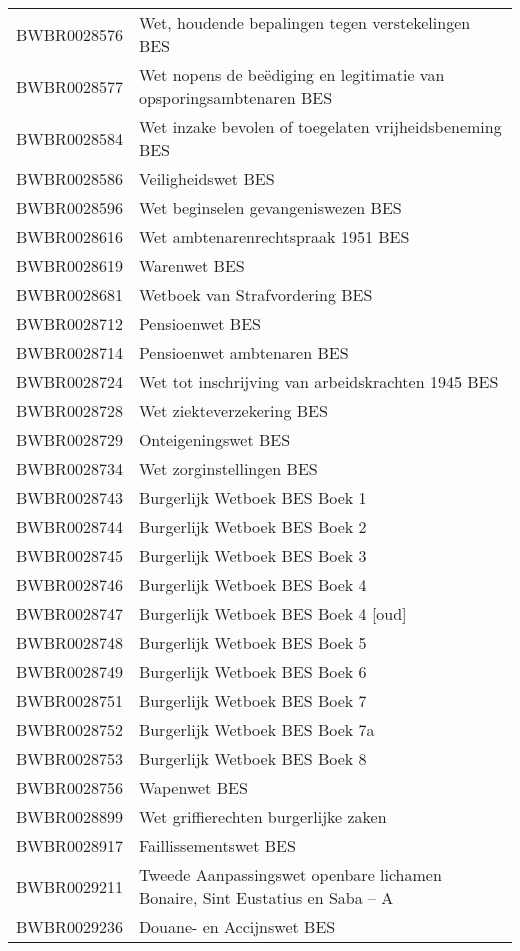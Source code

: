 \begin{longtable}{lp{}}
BWBR0028576 & Wet, houdende bepalingen tegen verstekelingen BES \\
BWBR0028577 & Wet nopens de beëdiging en legitimatie van opsporingsambtenaren BES \\
BWBR0028584 & Wet inzake bevolen of toegelaten vrijheidsbeneming BES \\
BWBR0028586 & Veiligheidswet BES \\
BWBR0028596 & Wet beginselen gevangeniswezen BES  \\
BWBR0028616 & Wet ambtenarenrechtspraak 1951 BES \\
BWBR0028619 & Warenwet BES  \\
BWBR0028681 & Wetboek van Strafvordering BES  \\
BWBR0028712 & Pensioenwet BES  \\
BWBR0028714 & Pensioenwet ambtenaren BES \\
BWBR0028724 & Wet tot inschrijving van arbeidskrachten 1945 BES \\
BWBR0028728 & Wet ziekteverzekering BES  \\
BWBR0028729 & Onteigeningswet BES  \\
BWBR0028734 & Wet zorginstellingen BES  \\
BWBR0028743 & Burgerlijk Wetboek BES Boek 1 \\
BWBR0028744 & Burgerlijk Wetboek BES Boek 2 \\
BWBR0028745 & Burgerlijk Wetboek BES Boek 3  \\
BWBR0028746 & Burgerlijk Wetboek BES Boek 4 \\
BWBR0028747 & Burgerlijk Wetboek BES Boek 4 [oud] \\
BWBR0028748 & Burgerlijk Wetboek BES Boek 5 \\
BWBR0028749 & Burgerlijk Wetboek BES Boek 6 \\
BWBR0028751 & Burgerlijk Wetboek BES Boek 7 \\
BWBR0028752 & Burgerlijk Wetboek BES Boek 7a \\
BWBR0028753 & Burgerlijk Wetboek BES Boek 8 \\
BWBR0028756 & Wapenwet BES  \\
BWBR0028899 & Wet griffierechten burgerlijke zaken  \\
BWBR0028917 & Faillissementswet BES \\
BWBR0029211 & Tweede Aanpassingswet openbare lichamen Bonaire, Sint Eustatius en Saba – A \\
BWBR0029236 & Douane- en Accijnswet BES \\

\end{longtable}
